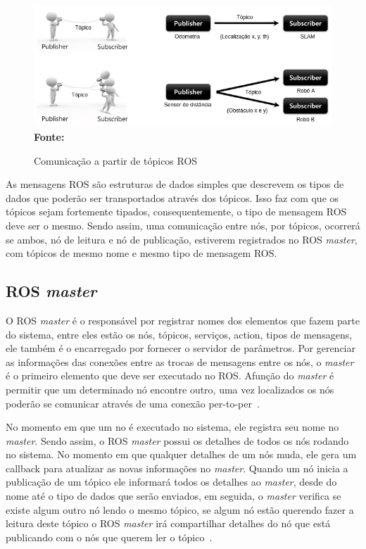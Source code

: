 \begin{figure}[ht]
	\caption{Comunicação a partir de tópicos ROS}
	\begin{center}
		\includegraphics[scale=0.51]{imagens/rostopic.png}\\
		{\small \textbf{Fonte:} }
    \end{center}\label{fig:rostopic}
\end{figure}

As mensagens ROS são estruturas de dados simples que descrevem os tipos de dados que poderão ser transportados através dos tópicos. Isso faz com que os tópicos sejam fortemente tipados, consequentemente, o tipo de mensagem ROS deve ser o mesmo. Sendo assim, uma comunicação entre nós, por tópicos, ocorrerá se ambos, nó de leitura e nó de publicação, estiverem registrados no ROS \textit{master}, com tópicos de mesmo nome e mesmo tipo de mensagem ROS\@.


\subsection{ROS \textit{master}}

O ROS \textit{master} é o responsável por registrar nomes dos elementos que fazem parte do sistema, entre eles estão os nós, tópicos, serviços, action, tipos de mensagens, ele também é o encarregado por fornecer o servidor de parâmetros. Por gerenciar as informações das conexões entre as trocas de mensagens entre os nós, o \textit{master} é o primeiro elemento que deve ser executado no ROS. Afunção do \textit{master} é permitir que um determinado nó encontre outro, uma vez localizados os nós poderão se comunicar através de uma conexão per-to-per~\cite{RosMaster}.

No momento em que um no é executado no sistema, ele registra seu nome no \textit{master}. Sendo assim, o ROS \textit{master} possui os detalhes de todos os nós rodando no sistema. No momento em que qualquer detalhes de um nós muda, ele gera um callback para atualizar as novas informações no \textit{master}. Quando um nó inicia a publicação de um tópico ele informará todos os detalhes ao \textit{master}, desde do nome até o tipo de dados que serão enviados, em seguida, o \textit{master} verifica se existe algum outro nó lendo o mesmo tópico, se algum nó estão querendo fazer a leitura deste tópico o ROS \textit{master} irá compartilhar detalhes do nó que está publicando com o nós que querem ler o tópico~\cite{rosPYO}.

